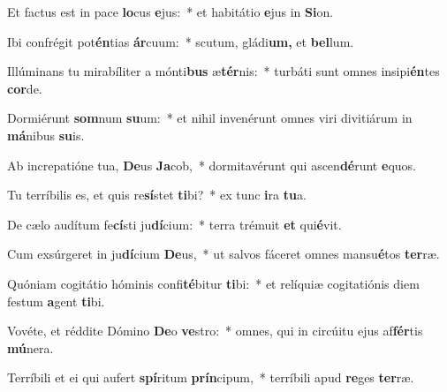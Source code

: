 \item Et factus est in pace \textbf{lo}cus \textbf{e}jus:~* et habitátio \textbf{e}jus in \textbf{Si}on.
\item Ibi confrégit pot\textbf{én}tias \textbf{ár}cuum:~* scutum, gládi\textbf{um,} et \textbf{bel}lum.
\item Illúminans tu mirabíliter a mónti\textbf{bus} æ\textbf{tér}nis:~* turbáti sunt omnes insipi\textbf{én}tes \textbf{cor}de.
\item Dormiérunt \textbf{som}num \textbf{su}um:~* et nihil invenérunt omnes viri divitiárum in \textbf{má}nibus \textbf{su}is.
\item Ab increpatióne tua, \textbf{De}us \textbf{Ja}cob,~* dormitavérunt qui ascen\textbf{dé}runt \textbf{e}quos.
\item Tu terríbilis es, et quis re\textbf{sí}stet \textbf{ti}bi?~* ex tunc \textbf{i}ra \textbf{tu}a.
\item De cælo audítum fe\textbf{cí}sti ju\textbf{dí}cium:~* terra trémuit \textbf{et} qui\textbf{é}vit.
\item Cum exsúrgeret in ju\textbf{dí}cium \textbf{De}us,~* ut salvos fáceret omnes mansu\textbf{é}tos \textbf{ter}ræ.
\item Quóniam cogitátio hóminis confi\textbf{té}bitur \textbf{ti}bi:~* et relíquiæ cogitatiónis diem festum \textbf{a}gent \textbf{ti}bi.
\item Vovéte, et réddite Dómino \textbf{De}o \textbf{ve}stro:~* omnes, qui in circúitu ejus af\textbf{fér}tis \textbf{mú}nera.
\item Terríbili et ei qui aufert \textbf{spí}ritum \textbf{prín}cipum,~* terríbili apud \textbf{re}ges \textbf{ter}ræ.
